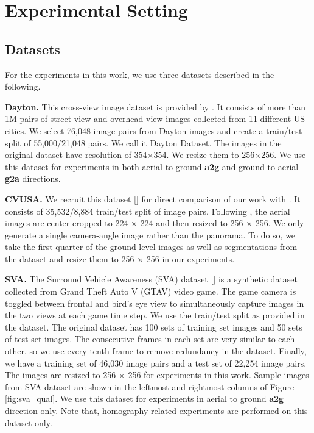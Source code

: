 \documentclass[times,twocolumn,final,authoryear]{elsarticle_modified}
\begin{document}
 \vspace{-5pt}
\section{Experimental Setting}
\label{sec:exp_setting}
\vspace{-5pt}
\subsection{Datasets}
For the experiments in this work, we use three datasets described in the following.

\noindent \textbf{Dayton.} This cross-view image dataset is provided by \cite{Vo2016}. It consists of more than 1M pairs of street-view and overhead view images collected from 11 different US cities. We select 76,048 image pairs from Dayton images and create a train/test split of 55,000/21,048 pairs. We call it Dayton Dataset. The images in the original dataset have resolution of 354$\times$354. We resize them to 256$\times$256. We use this dataset for experiments in both aerial to ground \textbf{a2g} and ground to aerial \textbf{g2a} directions.

\noindent \textbf{CVUSA.}
We recruit this dataset [\cite{workman2015wide}] for direct comparison of our work with \cite{zhai2017crossview}. It consists of 35,532/8,884 train/test split of image pairs. Following \cite{zhai2017crossview}, the aerial images are center-cropped to 224 $\times$ 224 and then resized to 256 $\times$ 256. We only generate a single camera-angle image rather than the panorama. To do so, we take the first quarter of the ground level images as well as segmentations from the dataset and resize them to 256 $\times$ 256 in our experiments. 

\noindent \textbf{SVA.} The Surround Vehicle Awareness (SVA) dataset [\cite{10.1007/978-3-319-68560-1_21}] is a synthetic dataset collected from Grand Theft Auto V (GTAV) video game. The game camera is toggled between frontal and bird's eye view to simultaneously capture images in the two views at each game time step. We use the train/test split as provided in the dataset. The original dataset has 100 sets of training set images and 50 sets of test set images. The consecutive frames in each set are very similar to each other, so we use every tenth frame to remove redundancy in the dataset. Finally, we have a training set of 46,030 image pairs and a test set of 22,254 image pairs. The images are resized to 256 $\times$ 256 for experiments in this work. Sample images from SVA dataset are shown in the leftmost and rightmost columns of Figure \ref{fig:sva_qual}. We use this dataset for experiments in aerial to ground \textbf{a2g} direction only. Note that, homography related experiments are performed on this dataset only. 
\end{document}
